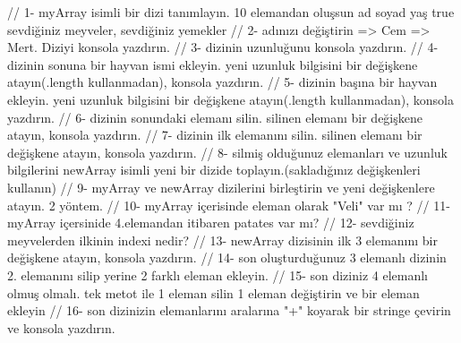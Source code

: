 // 1- myArray isimli bir dizi tanımlayın. 10 elemandan oluşsun ad soyad yaş true sevdiğiniz meyveler, sevdiğiniz yemekler
// 2- adınızı değiştirin => Cem => Mert. Diziyi konsola yazdırın.
// 3- dizinin uzunluğunu konsola yazdırın.
// 4- dizinin sonuna bir hayvan ismi ekleyin. yeni uzunluk bilgisini bir değişkene atayın(.length kullanmadan), konsola yazdırın.
// 5- dizinin başına bir hayvan ekleyin. yeni uzunluk bilgisini bir değişkene atayın(.length kullanmadan), konsola yazdırın.
// 6- dizinin sonundaki elemanı silin. silinen elemanı bir değişkene atayın, konsola yazdırın.
// 7- dizinin ilk elemanını silin. silinen elemanı bir değişkene atayın, konsola yazdırın.
// 8- silmiş olduğunuz elemanları ve uzunluk bilgilerini newArray isimli yeni bir dizide toplayın.(sakladığınız değişkenleri kullanın)
// 9- myArray ve newArray dizilerini birleştirin ve yeni değişkenlere atayın. 2 yöntem.
// 10- myArray içerisinde eleman olarak "Veli" var mı ?
// 11- myArray içersinide 4.elemandan itibaren patates var mı?
// 12- sevdiğiniz meyvelerden ilkinin indexi nedir?
// 13- newArray dizisinin ilk 3 elemanını bir değişkene atayın, konsola yazdırın.
// 14- son oluşturduğunuz 3 elemanlı dizinin 2. elemanını silip yerine 2 farklı eleman ekleyin.
// 15- son diziniz 4 elemanlı olmuş olmalı. tek metot ile 1 eleman silin 1 eleman değiştirin ve bir eleman ekleyin
// 16- son dizinizin elemanlarını aralarına "+" koyarak bir stringe çevirin ve konsola yazdırın.
